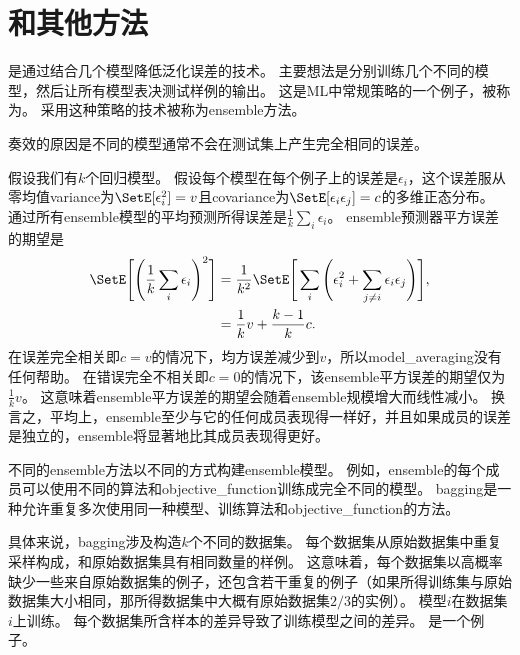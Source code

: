 \section{和其他方法}
\label{sec:bagging_and_other_ensemble_methods}
是通过结合几个模型降低泛化误差的技术\citep{Breiman-1994}。
主要想法是分别训练几个不同的模型，然后让所有模型表决测试样例的输出。
这是\gls{ML}中常规策略的一个例子，被称为。
采用这种策略的技术被称为\gls{ensemble}方法。

奏效的原因是不同的模型通常不会在测试集上产生完全相同的误差。

假设我们有$k$个回归模型。
假设每个模型在每个例子上的误差是$\epsilon_i$，这个误差服从零均值\gls{variance}为$\SetE[\epsilon_i^2] = v$且\gls{covariance}为$\SetE[\epsilon_i \epsilon_j] = c$的多维正态分布。
通过所有\gls{ensemble}模型的平均预测所得误差是$\frac{1}{k} \sum_i \epsilon_i$。 
\gls{ensemble}预测器平方误差的期望是
\begin{align}
 \SetE \Bigg[\Bigg(\frac{1}{k} \sum_i \epsilon_i \Bigg)^2\Bigg] &= \frac{1}{k^2} 
 \SetE \Bigg[\sum_i \Bigg(\epsilon_i^2 + \sum_{j \neq i} \epsilon_i \epsilon_j\Bigg)\Bigg], \\
&= \frac{1}{k} v + \frac{k-1}{k} c .                             
\end{align}
在误差完全相关即$c=v$的情况下，均方误差减少到$v$，所以\gls{model_averaging}没有任何帮助。
在错误完全不相关即$c =0$的情况下，该\gls{ensemble}平方误差的期望仅为$\frac{1}{k}v$。
这意味着\gls{ensemble}平方误差的期望会随着\gls{ensemble}规模增大而线性减小。
换言之，平均上，\gls{ensemble}至少与它的任何成员表现得一样好，并且如果成员的误差是独立的，\gls{ensemble}将显著地比其成员表现得更好。

不同的\gls{ensemble}方法以不同的方式构建\gls{ensemble}模型。
例如，\gls{ensemble}的每个成员可以使用不同的算法和\gls{objective_function}训练成完全不同的模型。
\gls{bagging}是一种允许重复多次使用同一种模型、训练算法和\gls{objective_function}的方法。


具体来说，\gls{bagging}涉及构造$k$个不同的数据集。
每个数据集从原始数据集中重复采样构成，和原始数据集具有相同数量的样例。
这意味着，每个数据集以高概率缺少一些来自原始数据集的例子，还包含若干重复的例子（如果所得训练集与原始数据集大小相同，那所得数据集中大概有原始数据集$2/3$的实例）。
模型$i$在数据集$i$上训练。
每个数据集所含样本的差异导致了训练模型之间的差异。
是一个例子。

